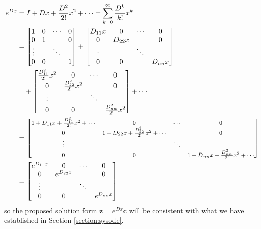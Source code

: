 \begin{align*}
e^{Dx} &= I + Dx + \frac{D^2}{2!}x^2 + \cdots = \sum_{k=0}^{\infty} \frac{D^k}{k!}x^k \\
&= \begin{bmatrix}
1 & 0 & \cdots & 0 \\
0 & 1 & & 0 \\
\vdots & & \ddots \\
0 & 0 & & 1
\end{bmatrix}
+
\begin{bmatrix}
D_{11}x & 0 & \cdots & 0 \\
0 & D_{22}x & & 0 \\
\vdots & & \ddots \\
0 & 0 & & D_{nn}x
\end{bmatrix} \\
&\quad + 
\begin{bmatrix}
\frac{D_{11}^2}{2!}x^2 & 0 & \cdots & 0 \\
0 & \frac{D_{22}^2}{2!}x^2 & & 0 \\
\vdots & & \ddots \\
0 & 0 & & \frac{D_{nn}^2}{2!}x^2
\end{bmatrix}
+ \cdots \\
&=
\footnotesize \begin{bmatrix}
1 + D_{11}x + \frac{D_{11}^2}{2!}x^2 + \cdots & 0 & \cdots & 0 \\
0 & 1 + D_{22}x + \frac{D_{22}^2}{2!}x^2 + \cdots & & 0 \\
\vdots & & \ddots \\
0 & 0 & & 1 + D_{nn}x + \frac{D_{nn}^2}{2!}x^2 + \cdots
\end{bmatrix} \\
&=
\begin{bmatrix}
e^{D_{11}x} & 0 & \cdots & 0 \\
0 & e^{D_{22}x} & & 0 \\
\vdots & & \ddots \\
0 & 0 & & e^{D_{nn}x}
\end{bmatrix}
\end{align*}
so the proposed solution form $\textbf{z} = e^{Dx}\textbf{c}$ will be consistent with what we have established in Section \ref{section:sysode}.\par

